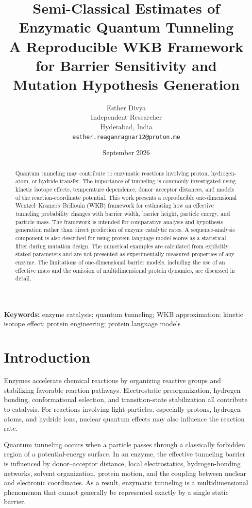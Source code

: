 \documentclass[11pt,a4paper]{article}
\title{
\textbf{Semi-Classical Estimates of Enzymatic Quantum Tunneling}\\[4pt]
\large A Reproducible WKB Framework for Barrier Sensitivity and Mutation Hypothesis Generation
}
\author{
Esther Divya\\
Independent Researcher\\
Hyderabad, India\\
\texttt{esther.reaganragnar12@proton.me}
}
\date{September 2026}
\begin{document}
\maketitle

\begin{abstract}
Quantum tunneling may contribute to enzymatic reactions involving proton,
hydrogen-atom, or hydride transfer. The importance of tunneling is commonly
investigated using kinetic isotope effects, temperature dependence, donor--acceptor
distances, and models of the reaction-coordinate potential. This work presents
a reproducible one-dimensional Wentzel--Kramers--Brillouin (WKB) framework for
estimating how an effective tunneling probability changes with barrier width,
barrier height, particle energy, and particle mass. The framework is intended
for comparative analysis and hypothesis generation rather than direct prediction
of enzyme catalytic rates. A sequence-analysis component is also described for
using protein language-model scores as a statistical filter during mutation
design. The numerical examples are calculated from explicitly stated parameters
and are not presented as experimentally measured properties of any enzyme.
The limitations of one-dimensional barrier models, including the use of an
effective mass and the omission of multidimensional protein dynamics, are
discussed in detail.
\end{abstract}

\textbf{Keywords:}
enzyme catalysis; quantum tunneling; WKB approximation;
kinetic isotope effect; protein engineering; protein language models

\section{Introduction}

Enzymes accelerate chemical reactions by organizing reactive groups and
stabilizing favorable reaction pathways. Electrostatic preorganization,
hydrogen bonding, conformational selection, and transition-state stabilization
all contribute to catalysis. For reactions involving light particles, especially
protons, hydrogen atoms, and hydride ions, nuclear quantum effects may also
influence the reaction rate.

Quantum tunneling occurs when a particle passes through a classically forbidden
region of a potential-energy surface. In an enzyme, the effective tunneling
barrier is influenced by donor--acceptor distance, local electrostatics,
hydrogen-bonding networks, solvent organization, protein motion, and the
coupling between nuclear and electronic coordinates. As a result, enzymatic
tunneling is a multidimensional phenomenon that cannot generally be represented
exactly by a single static barrier.
\end{document}
